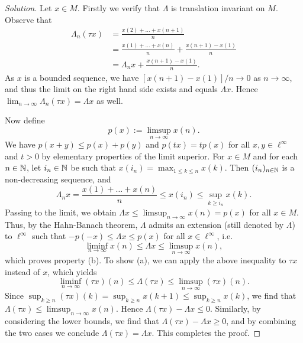 \begin{proof}[Solution]
	Let $x \in M$. Firstly we verify that $\Lambda$ is translation invariant on $M$. Observe that
	\begin{align*}
		\Lambda_n(\tau x) &= \frac{x(2)+\ldots+x(n+1)}{n} \\
		&= \frac{x(1)+\ldots+x(n)}{n} + \frac{x(n+1)-x(1)}{n} \\
		&= \Lambda_n x + \frac{x(n+1)-x(1)}{n}.
	\end{align*}
	As $x$ is a bounded sequence, we have $[x(n+1)-x(1)]/n \to 0$ as $n\to\infty$, and thus the limit on the right hand side exists and equals $\Lambda x$. Hence $\lim_{n\to\infty} \Lambda_n (\tau x) = \Lambda x$ as well. 
	
	Now define
	\begin{equation*}
		p(x) := \limsup_{n\to\infty} x(n).
	\end{equation*}
	We have $p(x+y) \le p(x)+p(y)$ and $p(tx) = tp(x)$ for all $x,y \in \ell^\infty$ and $t>0$ by elementary properties of the limit superior. For $x \in M$ and for each $n\in\mathbb{N}$, let $i_n \in \mathbb{N}$ be such that $x(i_n) = \max_{1\le k \le n} x(k)$. Then $(i_n)_{n\in\mathbb{N}}$ is a non-decreasing sequence, and
	\begin{equation*}
		\Lambda_n x = \frac{x(1)+\ldots+x(n)}{n} \le x(i_n) \le \sup_{k \ge i_n} x(k).
	\end{equation*}
	Passing to the limit, we obtain $\Lambda x \le \limsup_{n\to\infty}x(n) = p(x)$ for all $x \in M$. Thus, by the Hahn-Banach theorem, $\Lambda$ admits an extension (still denoted by $\Lambda$) to $\ell^\infty$ such that $-p(-x) \le \Lambda x \le p(x)$ for all $x \in \ell^\infty$, i.e.
	\begin{equation*}
		\liminf_{n\to\infty} x(n) \le \Lambda x \le \limsup_{n\to\infty} x(n),
	\end{equation*}
	which proves property (b). To show (a), we can apply the above inequality to $\tau x$ instead of $x$, which yields
	\begin{equation*}
		\liminf_{n\to\infty} (\tau x)(n) \le \Lambda(\tau x) \le \limsup_{n\to\infty} (\tau x)(n).
	\end{equation*}
	Since $\sup_{k \ge n} (\tau x)(k) = \sup_{k \ge n} x(k+1) \le \sup_{k \ge n}x(k)$, we find that $\Lambda (\tau x) \le \limsup_{n\to\infty} x(n)$. Hence $\Lambda(\tau x) - \Lambda x \le 0$. Similarly, by considering the lower bounds, we find that $\Lambda(\tau x) - \Lambda x \ge 0$, and by combining the two cases we conclude $\Lambda (\tau x) = \Lambda x$. This completes the proof.
\end{proof}

